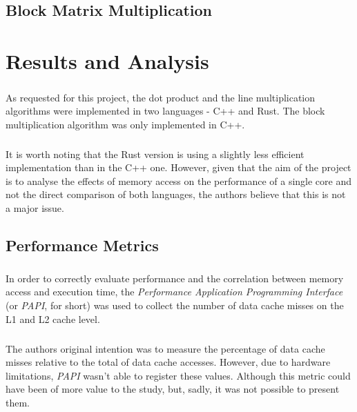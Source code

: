 \documentclass{report}
\begin{document}
		\section{Block Matrix Multiplication}
	
	\chapter{Results and Analysis}
	
		\paragraph{}As requested for this project, the dot product and the line multiplication algorithms were implemented in two languages - C++ and Rust. The block multiplication algorithm was only implemented in C++.
		
		\paragraph{}It is worth noting that the Rust version is using a slightly less efficient implementation than in the C++ one. However, given that the aim of the project is to analyse the effects of memory access on the performance of a single core and not the direct comparison of both languages, the authors believe that this is not a major issue.
	
		\section{Performance Metrics}
		
			\paragraph{}In order to correctly evaluate performance and the correlation between memory access and execution time,  the \emph{Performance Application Programming Interface} (or \emph{PAPI}, for short) was used to collect the number of data cache misses on the L1 and L2 cache level.
			
			\paragraph{}The authors original intention was to measure the percentage of data cache misses relative to the total of data cache accesses. However, due to hardware limitations, \emph{PAPI} wasn't able to register these values. Although this metric could have been of more value to the study, but, sadly, it was not possible to present them.
			
\end{document}
